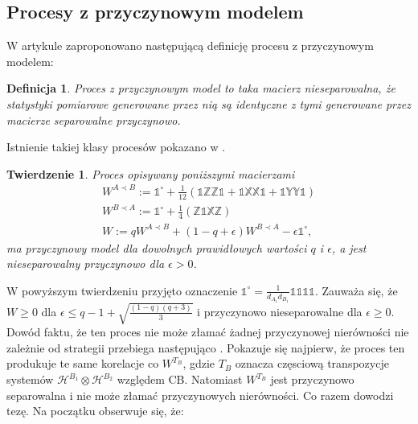 \documentclass[10pt]{article} %
\newtheorem{definicja}{Definicja}
\newtheorem{tw}{Twierdzenie}
\newcommand{\Hx}[1]{\mathcal{H}^{#1}}
\newcommand{\X}{\mathbb{X}}
\newcommand{\Y}{\mathbb{Y}}
\newcommand{\Z}{\mathbb{Z}}
\newcommand{\I}{\mathbb{1}}
\newcommand{\IO}{\mathbb{1}^\circ}
\begin{document}
\subsection{Procesy z przyczynowym modelem}
W artykule \cite{causal_model} zaproponowano następującą definicję procesu z przyczynowym modelem:
\begin{definicja}
Proces z przyczynowym model to taka macierz nieseparowalna, że statystyki pomiarowe generowane przez nią są identyczne z tymi generowane przez macierze separowalne przyczynowo.
\end{definicja}
Istnienie takiej klasy procesów pokazano w \cite{causal_model}. 
\begin{tw}
Proces opisywany poniższymi macierzami
\begin{gather}
W^{A \prec B} := \IO + \frac{1}{12}(\I\Z\Z\I + \I\X\X\I + \I\Y\Y\I) \\
W^{B \prec A} := \IO + \frac{1}{4}(\Z\I\X\Z)\\
\label{eq:nsep_causal}
W := qW^{A \prec B} + (1-q+\epsilon)W^{B \prec A} -\epsilon\IO,
\end{gather}
ma przyczynowy model dla dowolnych prawidłowych wartości $q$ i $\epsilon$, a jest nieseparowalny przyczynowo dla $\epsilon > 0$.
\end{tw}
W powyższym twierdzeniu przyjęto oznaczenie $\IO = \frac{1}{d_{A_1}d_{B_1}} \I\I\I\I$.
Zauważa się, że $W \geq 0$ dla $\epsilon \leq q- 1 + \sqrt{\frac{(1-q)(q+3)}{3}}$ i przyczynowo nieseparowalne dla $\epsilon \geq 0$. 
Dowód faktu, że ten proces nie może złamać żadnej przyczynowej nierówności nie zależnie od strategii przebiega następująco \cite{causal_model}.
Pokazuje się najpierw, że proces ten produkuje te same korelacje co $W^{T_B}$, gdzie $T_B$ oznacza częsciową transpozycje systemów $\Hx{B_1} \otimes \Hx{B_2}$ względem CB. Natomiast $W^{T_B}$ jest przyczynowo separowalna i nie może złamać przyczynowych nierówności. Co razem dowodzi tezę. Na początku obserwuje się, że:
\end{document}
